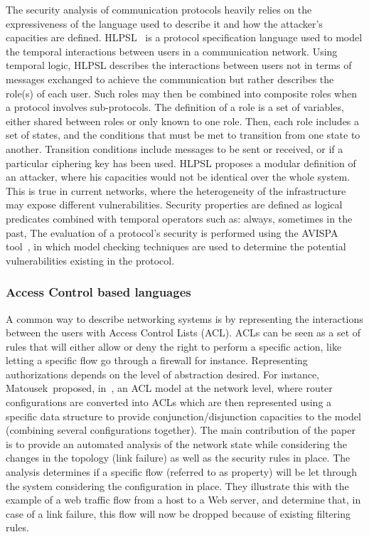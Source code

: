 The security analysis of communication protocols heavily relies on the expressiveness of the language used to describe it and how the attacker's capacities are defined. HLPSL~\cite{HLPSL-Chevalier2004} is a protocol specification language used to model the temporal interactions between users in a communication network. Using temporal logic, HLPSL describes the interactions between users not in terms of messages exchanged to achieve the communication but rather describes the role(s) of each user. Such roles may then be combined into composite roles when a protocol involves sub-protocols.
The definition of a role is a set of variables, either shared between roles or only known to one role.
Then, each role includes a set of states, and the conditions that must be met to transition from one state to another. Transition conditions include messages to be sent or received, or if a particular ciphering key has been used.
HLPSL proposes a modular definition of an attacker, where his capacities would not be identical over the whole system.
This is true in current networks, where the heterogeneity of the infrastructure may expose different vulnerabilities.
Security properties are defined as logical predicates combined with temporal operators such as: always, sometimes in the past, \etc
The evaluation of a protocol's security is performed using the AVISPA tool~\cite{avispa}, in which model checking techniques are used to determine the potential vulnerabilities existing in the protocol.

\subsubsection{Access Control based languages}
A common way to describe networking systems is by representing the interactions between the users with Access Control Lists (ACL).
ACLs can be seen as a set of rules that will either allow or deny the right to perform a specific action, like letting a specific flow go through a firewall for instance.
Representing authorizations depends on the level of abstraction desired.
For instance, Matousek~\etal proposed, in~\cite{Matousek2008}, an ACL model at the network level, where router configurations are converted into ACLs which are then represented using a specific data structure to provide conjunction/disjunction capacities to the model (\ie combining several configurations together).
The main contribution of the paper is to provide an automated analysis of the network state while considering the changes in the topology (\ie link failure) as well as the security rules in place.
The analysis determines if a specific flow (referred to as property) will be let through the system considering the configuration in place. They illustrate this with the example of a web traffic flow from a host to a Web server, and determine that, in case of a link failure, this flow will now be dropped because of existing filtering rules.

